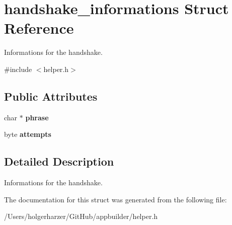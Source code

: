 \hypertarget{structhandshake__informations}{\section{handshake\+\_\+informations Struct Reference}
\label{structhandshake__informations}
}


Informations for the handshake.  




{\ttfamily \#include $<$helper.\+h$>$}

\subsection*{Public Attributes}
\begin{DoxyCompactItemize}
\item 
\hypertarget{structhandshake__informations_ad4f282832c3a4e2f59269a68c66ffd1b}{char $\ast$ {\bfseries phrase}}\label{structhandshake__informations_ad4f282832c3a4e2f59269a68c66ffd1b}

\item 
\hypertarget{structhandshake__informations_a728e648cbfb9fb7a1cf1bc97493a976c}{byte {\bfseries attempts}}\label{structhandshake__informations_a728e648cbfb9fb7a1cf1bc97493a976c}

\end{DoxyCompactItemize}


\subsection{Detailed Description}
Informations for the handshake. 

The documentation for this struct was generated from the following file\+:\begin{DoxyCompactItemize}
\item 
/\+Users/holgerharzer/\+Git\+Hub/appbuilder/helper.\+h\end{DoxyCompactItemize}
